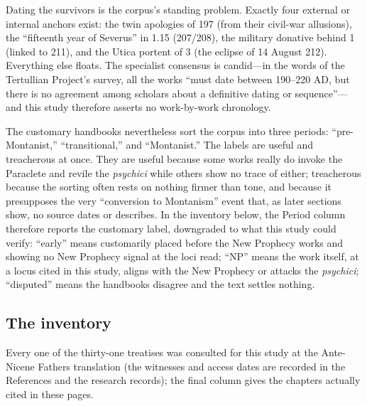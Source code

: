 Dating the survivors is the corpus's standing problem. Exactly four external
or internal anchors exist: the twin apologies of 197 (from their civil-war
allusions), the ``fifteenth year of Severus'' in  1.15
(207/208), the military donative behind  1 (linked to 211),
and the Utica portent of  3 (the eclipse of 14 August 212).
Everything else floats. The specialist consensus is candid---in the words of
the Tertullian Project's survey, all the works ``must date between 190--220
AD, but there is no agreement among scholars about a definitive dating or
sequence''---and this study therefore asserts no work-by-work chronology.

The customary handbooks nevertheless sort the corpus into three periods:
``pre-Montanist,'' ``transitional,'' and ``Montanist.'' The labels are useful
and treacherous at once. They are useful because some works really do invoke
the Paraclete and revile the \textit{psychici} while others show no trace of
either; treacherous because the sorting often rests on nothing firmer than
tone, and because it presupposes the very ``conversion to Montanism'' event
that, as later sections show, no source dates or describes. In the inventory
below, the Period column therefore reports the customary label, downgraded to
what this study could verify: ``early'' means customarily placed before the
New Prophecy works and showing no New Prophecy signal at the loci read;
``NP'' means the work itself, at a locus cited in this study, aligns with the
New Prophecy or attacks the \textit{psychici}; ``disputed'' means the
handbooks disagree and the text settles nothing.

\subsection{The inventory}

Every one of the thirty-one treatises was consulted for this study at the
Ante-Nicene Fathers translation (the witnesses and access dates are recorded
in the References and the research records); the final column gives the
chapters actually cited in these pages.

